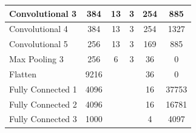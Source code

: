 \begin{center}
\begin{table}[]
\begin{tabular}{|l|c|c|c|c|c|}
Convolutional 3   & 384                                                            & 13                                                            & 3                                                             & 254                                                            & 885                 \\ \hline
Convolutional 4   & 384                                                            & 13                                                            & 3                                                             & 254                                                            & 1327                \\ \hline
Convolutional 5   & 256                                                            & 13                                                            & 3                                                             & 169                                                            & 885                 \\ \hline
Max Pooling 3     & 256                                                            & 6                                                             & 3                                                             & 36                                                             & 0                   \\ \hline
Flatten           & 9216                                                           &                                                               &                                                               & 36                                                             & 0                   \\ \hline
Fully Connected 1 & 4096                                                           &                                                               &                                                               & 16                                                             & 37753               \\ \hline
Fully Connected 2 & 4096                                                           &                                                               &                                                               & 16                                                             & 16781               \\ \hline
Fully Connected 3 & 1000                                                           &                                                               &                                                               & 4                                                              & 4097                \\ \hline

\end{tabular}
\end{table}
\end{center}
